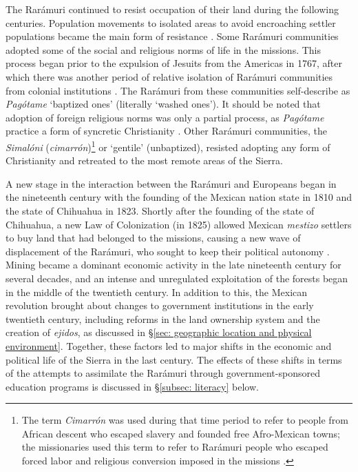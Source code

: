The Rarámuri continued to resist occupation of their land during the following centuries. Population movements to isolated areas to avoid encroaching settler populations became the main form of resistance \citep{merrill1983tarahumara,levi1999hidden}. Some Rarámuri communities adopted some of the social and religious norms of life in the missions. This process began prior to the expulsion of Jesuits from the Americas in 1767, after which there was another period of relative isolation of Rarámuri communities from colonial institutions \citep{pintado2012hijos}. The Rarámuri from these communities self-describe as \textit{Pagótame} `baptized ones' (literally `washed ones'). It should be noted that adoption of foreign religious norms was only a partial process, as \textit{Pagótame} practice a form of syncretic Christianity \citep{merrill1983tarahumara,merrill1988raramuri}. Other Rarámuri communities, the \textit{Simalóni} (\textit{cimarrón})\footnote{The term \textit{Cimarrón} was used during that time period to refer to people from African descent who escaped slavery and founded free Afro-Mexican towns; the missionaries used this term to refer to Rarámuri people who escaped forced labor and religious conversion imposed in the missions \citep[53]{pintado2012hijos}.} or `gentile' (unbaptized), resisted adopting any form of Christianity and retreated to the most remote areas of the Sierra.

\largerpage
A new stage in the interaction between the Rarámuri and Europeans began in the nineteenth century with the founding of the Mexican nation state in 1810 and the state of Chihuahua in 1823. Shortly after the founding of the state of Chihuahua, a new Law of Colonization (in 1825) allowed Mexican \textit{mestizo} settlers to buy land that had belonged to the missions, causing a new wave of displacement of the Rarámuri, who sought to keep their political autonomy \citep{pintado2012hijos}. Mining became a dominant economic activity in the late nineteenth century for several decades, and an intense and unregulated exploitation of the forests began in the middle of the twentieth century. In addition to this, the Mexican revolution brought about changes to government institutions in the early twentieth century, including reforms in the land ownership system and the creation of \textit{ejidos}, as discussed in §\ref{sec: geographic location and physical environment}. Together, these factors led to major shifts in the economic and political life of the Sierra in the last century. The effects of these shifts in terms of the attempts to assimilate the Rarámuri through government-sponsored education programs is discussed in §\ref{subsec: literacy} below.

